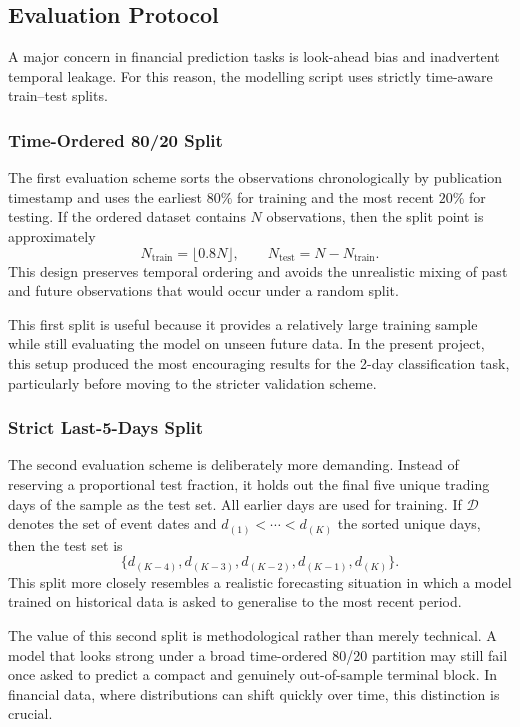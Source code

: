 \subsection{Evaluation Protocol}

A major concern in financial prediction tasks is look-ahead bias and inadvertent temporal leakage. For this reason, the modelling script uses strictly time-aware train--test splits.

\subsubsection{Time-Ordered 80/20 Split}

The first evaluation scheme sorts the observations chronologically by publication timestamp and uses the earliest $80\%$ for training and the most recent $20\%$ for testing. If the ordered dataset contains $N$ observations, then the split point is approximately
\[
N_{\text{train}} = \lfloor 0.8N \rfloor,
\qquad
N_{\text{test}} = N - N_{\text{train}}.
\]
This design preserves temporal ordering and avoids the unrealistic mixing of past and future observations that would occur under a random split.

This first split is useful because it provides a relatively large training sample while still evaluating the model on unseen future data. In the present project, this setup produced the most encouraging results for the 2-day classification task, particularly before moving to the stricter validation scheme.

\subsubsection{Strict Last-5-Days Split}

The second evaluation scheme is deliberately more demanding. Instead of reserving a proportional test fraction, it holds out the final five unique trading days of the sample as the test set. All earlier days are used for training. If $\mathcal{D}$ denotes the set of event dates and $d_{(1)} < \cdots < d_{(K)}$ the sorted unique days, then the test set is
\[
\{d_{(K-4)}, d_{(K-3)}, d_{(K-2)}, d_{(K-1)}, d_{(K)}\}.
\]
This split more closely resembles a realistic forecasting situation in which a model trained on historical data is asked to generalise to the most recent period.

The value of this second split is methodological rather than merely technical. A model that looks strong under a broad time-ordered 80/20 partition may still fail once asked to predict a compact and genuinely out-of-sample terminal block. In financial data, where distributions can shift quickly over time, this distinction is crucial.

